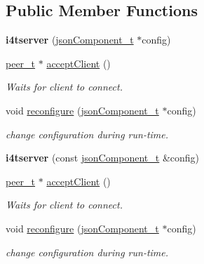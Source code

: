 \subsection*{\-Public \-Member \-Functions}
\begin{DoxyCompactItemize}
\item 
\hypertarget{classi4tserver_aa3df16ecc6f139d7438761dea8574c37}{{\bfseries i4tserver} (\hyperlink{classjsonComponent__t}{json\-Component\-\_\-t} $\ast$config)}\label{classi4tserver_aa3df16ecc6f139d7438761dea8574c37}

\item 
\hyperlink{classpeer__t}{peer\-\_\-t} $\ast$ \hyperlink{classi4tserver_a7d977e4e414f86a128a5402083846bb7}{accept\-Client} ()
\begin{DoxyCompactList}\small\item\em \-Waits for client to connect. \end{DoxyCompactList}\item 
void \hyperlink{classi4tserver_a12b4f79e75ad1d2ee434639202fbbe12}{reconfigure} (\hyperlink{classjsonComponent__t}{json\-Component\-\_\-t} $\ast$config)
\begin{DoxyCompactList}\small\item\em change configuration during run-\/time. \end{DoxyCompactList}\item 
\hypertarget{classi4tserver_a6b8736eb4c45504be1dc9ee2e81b5310}{{\bfseries i4tserver} (const \hyperlink{classjsonComponent__t}{json\-Component\-\_\-t} \&config)}\label{classi4tserver_a6b8736eb4c45504be1dc9ee2e81b5310}

\item 
\hyperlink{classpeer__t}{peer\-\_\-t} $\ast$ \hyperlink{classi4tserver_a7d977e4e414f86a128a5402083846bb7}{accept\-Client} ()
\begin{DoxyCompactList}\small\item\em \-Waits for client to connect. \end{DoxyCompactList}\item 
void \hyperlink{classi4tserver_a12b4f79e75ad1d2ee434639202fbbe12}{reconfigure} (\hyperlink{classjsonComponent__t}{json\-Component\-\_\-t} $\ast$config)
\begin{DoxyCompactList}\small\item\em change configuration during run-\/time. \end{DoxyCompactList}\end{DoxyCompactItemize}


